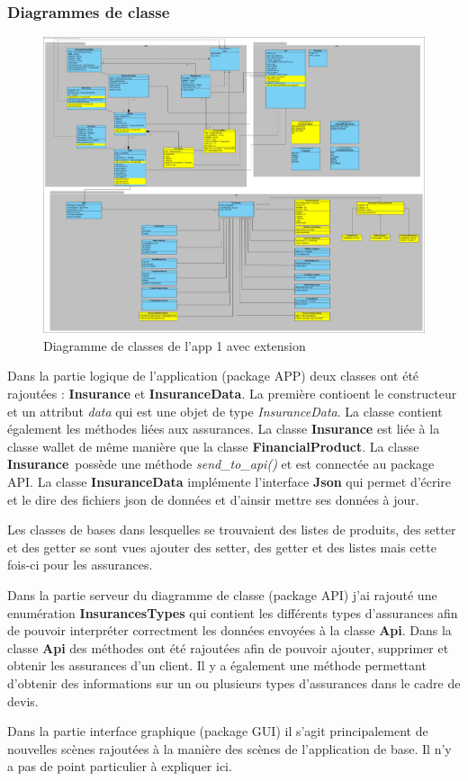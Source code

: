 \documentclass[../rapport.tex]{subfiles}
\begin{document}
		\subsubsection{Diagrammes de classe}
				\begin{figure}[h]
						\centering\includegraphics[scale=0.15]{ressources/photos_diagrammes/extensionThomas/class1ExtensionThomas.jpg}
						\caption{Diagramme de classes de l'app 1 avec extension}
				\end{figure}
		Dans la partie logique de l'application (package APP) deux classes ont été rajoutées :
		\textbf{Insurance} et \textbf{InsuranceData}. La première contioent le constructeur et 
		un attribut \textit{data} qui est une objet de type \textit{InsuranceData}. La classe 
		contient également les méthodes liées aux assurances. La classe \textbf{Insurance} est
		liée à la classe wallet de même manière que la classe \textbf{FinancialProduct}. 
		La classe \textbf{Insurance} possède une méthode \textit{send\_to\_api()} et est connectée 
		au package API. La classe \textbf{InsuranceData} implémente l'interface \textbf{Json} qui
		permet d'écrire et le dire des fichiers json de données et d'ainsir mettre ses données à
		jour.

		\medskip

		Les classes de bases dans lesquelles se trouvaient des listes de produits, des setter et 
		des getter se sont vues ajouter des setter, des getter et des listes mais cette fois-ci
		pour les assurances. 

		\bigskip

		Dans la partie serveur du diagramme de classe (package API) j'ai rajouté une enumération
		\textbf{InsurancesTypes} qui contient les différents types d'assurances afin de pouvoir
		interpréter correctment les données envoyées à la classe \textbf{Api}. Dans la classe
		\textbf{Api} des méthodes ont été rajoutées afin de pouvoir ajouter, supprimer et obtenir
		les assurances d'un client. Il y a également une méthode permettant d'obtenir des 
		informations sur un ou plusieurs types d'assurances dans le cadre de devis.

		\bigskip

		Dans la partie interface graphique (package GUI) il s'agit principalement de nouvelles 
		scènes rajoutées à la manière des scènes de l'application de base. Il n'y a pas de 
		point particulier à expliquer ici.
\newpage
\end{document}
